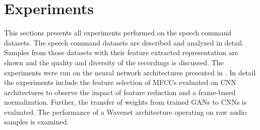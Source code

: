 
\chapter{Experiments}\label{sec:exp}
This sections presents all experiments performed on the speech command datasets.
The speech command datasets are described and analyzed in detail.
Samples from those datasets with their feature extracted representation are shown and the quality and diversity of the recordings is discussed.
The experiments were run on the neural network architectures presented in .
In detail the experiments include the feature selection of MFCCs evaluated on CNN architectures to observe the impact of feature reduction and a frame-based normalization.
Further, the transfer of weights from trained GANs to CNNs is evaluated.
The performance of a Wavenet architecture operating on raw audio samples is examined.








